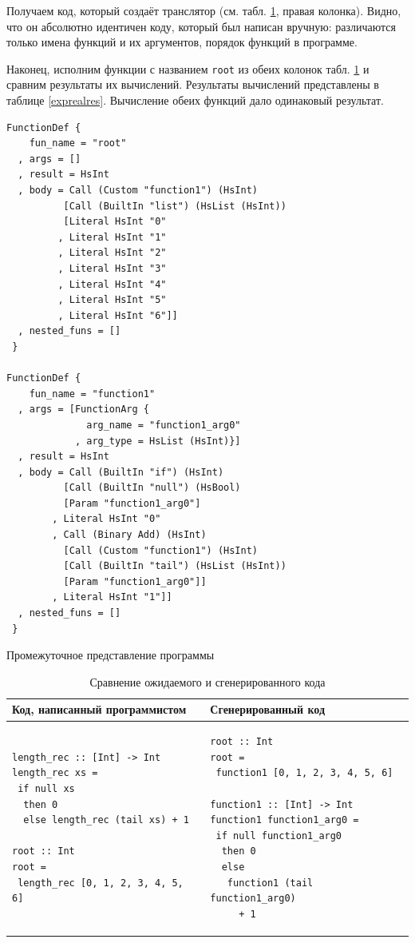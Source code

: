 Получаем код, который создаёт транслятор (см. табл. \ref{expectreal}, правая колонка). Видно, что он абсолютно идентичен коду, который был написан вручную: различаются только имена функций и их аргументов, порядок функций в программе.

Наконец, исполним функции с названием \lstinline!root! из обеих колонок табл. \ref{expectreal} и сравним результаты их вычислений. Результаты вычислений представлены в таблице \ref{exprealres}. Вычисление обеих функций дало одинаковый результат.


\begin{ListingEnv}[h]
\begin{lstlisting}
FunctionDef {
    fun_name = "root"
  , args = []
  , result = HsInt
  , body = Call (Custom "function1") (HsInt) 
          [Call (BuiltIn "list") (HsList (HsInt)) 
          [Literal HsInt "0"
         , Literal HsInt "1"
         , Literal HsInt "2"
         , Literal HsInt "3"
         , Literal HsInt "4"
         , Literal HsInt "5"
         , Literal HsInt "6"]]
  , nested_funs = []
 }
 
FunctionDef {
    fun_name = "function1"
  , args = [FunctionArg {
              arg_name = "function1_arg0"
            , arg_type = HsList (HsInt)}]
  , result = HsInt
  , body = Call (BuiltIn "if") (HsInt) 
          [Call (BuiltIn "null") (HsBool) 
          [Param "function1_arg0"]
        , Literal HsInt "0"
        , Call (Binary Add) (HsInt) 
          [Call (Custom "function1") (HsInt) 
          [Call (BuiltIn "tail") (HsList (HsInt)) 
          [Param "function1_arg0"]]
        , Literal HsInt "1"]]
  , nested_funs = []
 }
\end{lstlisting}
\caption{Промежуточное представление программы}\label{intermed}
\end{ListingEnv}

\begin{table}[h]
\centering
\begin{tabular}{|l|l|}
\hline
Код, написанный программистом &
Сгенерированный код \\
\hline
\begin{lstlisting}
length_rec :: [Int] -> Int
length_rec xs = 
 if null xs
  then 0
  else length_rec (tail xs) + 1

root :: Int
root = 
 length_rec [0, 1, 2, 3, 4, 5, 6]
\end{lstlisting} &
\begin{lstlisting}
root :: Int
root = 
 function1 [0, 1, 2, 3, 4, 5, 6]

function1 :: [Int] -> Int
function1 function1_arg0 = 
 if null function1_arg0
  then 0
  else 
   function1 (tail function1_arg0)
     + 1
\end{lstlisting} \\
\hline
\end{tabular}
\caption{Сравнение ожидаемого и сгенерированного кода}\label{expectreal}
\end{table}

